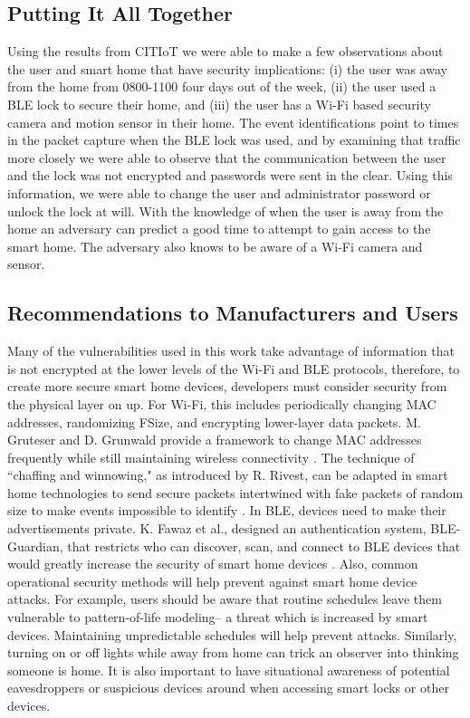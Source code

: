 \documentclass[conference]{./IEEEtran/IEEEtran}
\begin{document}
\subsection{Putting It All Together}

Using the results from CITIoT we were able to make a few observations about the user and smart home that have security implications: (i) the user was away from the home from 0800-1100 four days out of the week, (ii) the user used a \ac{BLE} lock to secure their home, and (iii) the user has a Wi-Fi based security camera and motion sensor in their home. The event identifications point to times in the packet capture when the \ac{BLE} lock was used, and by examining that traffic more closely we were able to observe that the communication between the user and the lock was not encrypted and passwords were sent in the clear. Using this information, we were able to change the user and administrator password or unlock the lock at will. With the knowledge of when the user is away from the home an adversary can predict a good time to attempt to gain access to the smart home. The adversary also knows to be aware of a Wi-Fi camera and sensor.

\subsection{Recommendations to Manufacturers and Users}
Many of the vulnerabilities used in this work take advantage of information that is not encrypted at the lower levels of the Wi-Fi and \ac{BLE} protocols, therefore, to create more secure smart home devices, developers must consider security from the physical layer on up. For Wi-Fi, this includes periodically changing \ac{MAC} addresses, randomizing \ac{FSize}, and encrypting lower-layer data packets. M. Gruteser and D. Grunwald provide a framework to change \ac{MAC} addresses frequently while still maintaining wireless connectivity \cite{Gruteser}. The technique of ``chaffing and winnowing," as introduced by R. Rivest, can be adapted in smart home technologies to send secure packets intertwined with fake packets of random size to make events impossible to identify \cite{Rivest}. In \ac{BLE}, devices need to make their advertisements private. K. Fawaz et al., designed an authentication system, \ac{BLE}-Guardian, that restricts who can discover, scan, and connect to \ac{BLE} devices that would greatly increase the security of smart home devices \cite{Fawaz}. Also, common operational security methods will help prevent against smart home device attacks. For example, users should be aware that routine schedules leave them vulnerable to pattern-of-life modeling-- a threat which is increased by smart devices. Maintaining unpredictable schedules will help prevent attacks. Similarly, turning on or off lights while away from home can trick an observer into thinking someone is home. It is also important to have situational awareness of potential eavesdroppers or suspicious devices around when accessing smart locks or other devices.
\end{document}
